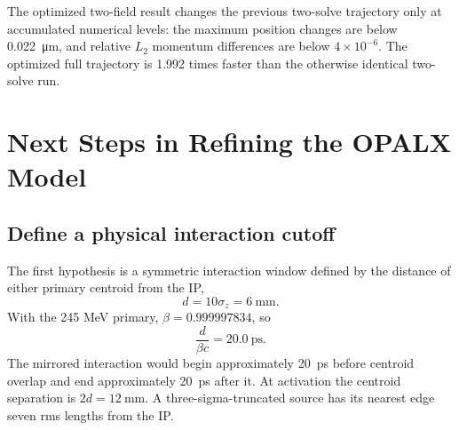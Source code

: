 \documentclass[11pt,a4paper]{article}
\begin{document}
The optimized two-field result changes the previous two-solve trajectory only
at accumulated numerical levels: the maximum position changes are below
\SI{0.022}{\micro\metre}, and relative $L_2$ momentum differences are below
$4\times10^{-6}$.  The optimized full trajectory is 1.992 times faster than
the otherwise identical two-solve run.

\section{Next Steps in Refining the OPALX Model}

\subsection{Define a physical interaction cutoff}

The first hypothesis is a symmetric interaction window defined by the distance
of either primary centroid from the IP,
\begin{equation}
  d=10\sigma_z=\SI{6}{\milli\metre}.
\end{equation}
With the 245 MeV primary, $\beta=0.999997834$, so
\begin{equation}
  \frac{d}{\beta c}=\SI{20.0}{\pico\second}.
\end{equation}
The mirrored interaction would begin approximately \SI{20}{\pico\second}
before centroid overlap and end approximately \SI{20}{\pico\second} after it.
At activation the centroid separation is $2d=\SI{12}{\milli\metre}$.  A
three-sigma-truncated source has its nearest edge seven rms lengths from the
IP.
\end{document}
